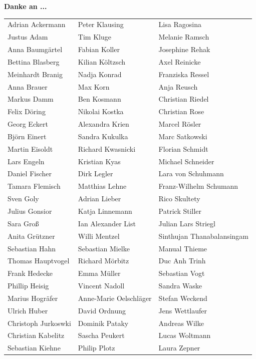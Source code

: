 \textbf{Danke an ...}
\\

\begin{tabular}{l l l} 

Adrian Ackermann  & Peter Klausing  & Lisa Ragosina\\
Justus Adam  & Tim Kluge & Melanie Ramsch\\
Anna Baumgärtel  & Fabian Koller & Josephine Rehak\\
Bettina  Blasberg & Kilian Költzsch & Axel Reinicke\\
Meinhardt Branig & Nadja Konrad & Franziska Ressel\\
Anna Brauer & Max Korn & Anja Reusch\\
Markus Damm & Ben Kosmann  & Christian Riedel\\
Felix Döring  & Nikolai Kostka & Christian Rose\\
Georg Eckert & Alexandra Krien & Marcel Rösler\\
Björn Einert & Sandra Kukulka & Marc Satkowski\\
Martin Eisoldt & Richard Kwasnicki & Florian Schmidt\\
Lars Engeln  & Kristian Kyas & Michael Schneider\\
Daniel Fischer & Dirk Legler & Lara von Schuhmann\\
Tamara Flemisch & Matthias Lehne & Franz-Wilhelm Schumann\\
Sven Goly & Adrian Lieber & Rico Skultety\\
Julius Gonsior & Katja Linnemann & Patrick Stiller\\
Sara Groß & Ian Alexander List & Julian Lars Striegl\\
Anita Grützner & Willi Mentzel & Sinthujan Thanabalansingam\\
Sebastian Hahn & Sebastian Mielke & Manual Thieme\\
Thomas Hauptvogel & Richard Mörbitz & Duc Anh Trinh\\
Frank Hedecke & Emma Müller & Sebastian Vogt\\
Phillip Heisig & Vincent Nadoll & Sandra Waske\\
Marius Hogräfer & Anne-Marie Oelschläger & Stefan Weckend\\
Ulrich Huber & David Ordnung & Jens Wettlaufer\\
Christoph Jurkoswki & Dominik Pataky & Andreas Wilke\\
Christian Kabelitz & Sascha Peukert & Lucas Woltmann\\
Sebastian Kiehne & Philip Plotz & Laura Zepner\\

\end{tabular}

